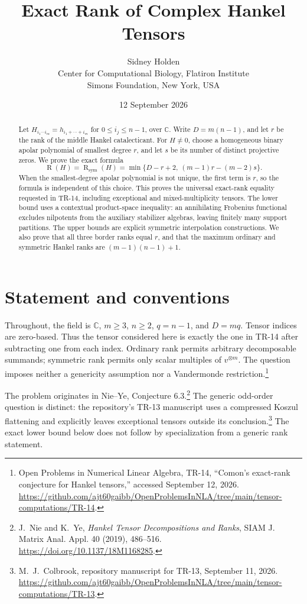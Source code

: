 \documentclass[11pt]{article}
\title{Exact Rank of Complex Hankel Tensors}
\author{Sidney Holden\\{\small Center for Computational Biology, Flatiron Institute}\\{\small Simons Foundation, New York, USA}}
\date{12 September 2026}
\theoremstyle{definition}
\theoremstyle{remark}
\newcommand{\C}{\mathbb C}
\newcommand{\Rk}{\operatorname{R}}
\newcommand{\SR}{\operatorname{R}_{\mathrm{sym}}}
\begin{document}
\maketitle

\begin{abstract}
Let $H_{i_1\cdots i_m}=h_{i_1+\cdots+i_m}$ for $0\le i_j\le n-1$, over $\C$.
Write $D=m(n-1)$, and let $r$ be the rank of the middle Hankel catalecticant.
For $H\ne0$, choose a homogeneous binary apolar polynomial of smallest degree $r$,
and let $s$ be its number of distinct projective zeros.
We prove the exact formula
\[
\Rk(H)=\SR(H)=\min\{D-r+2,\ (m-1)r-(m-2)s\}.
\]
When the smallest-degree apolar polynomial is not unique, the first term is $r$,
so the formula is independent of this choice. This proves the universal exact-rank
equality requested in TR-14, including exceptional and mixed-multiplicity tensors.
The lower bound uses a contextual product-space inequality: an annihilating
Frobenius functional excludes nilpotents from the auxiliary stabilizer algebras,
leaving finitely many support partitions. The upper bounds are explicit symmetric
interpolation constructions. We also prove that all three border ranks equal $r$,
and that the maximum ordinary and symmetric Hankel ranks are
$(m-1)(n-1)+1$.
\end{abstract}

\section{Statement and conventions}

Throughout, the field is $\C$, $m\ge3$, $n\ge2$, $q=n-1$, and $D=mq$.
Tensor indices are zero-based. Thus the tensor considered here is exactly the
one in TR-14 after subtracting one from each index. Ordinary rank permits
arbitrary decomposable summands; symmetric rank permits only scalar multiples
of $v^{\otimes m}$. The question imposes neither a genericity assumption nor a
Vandermonde restriction.\footnote{Open Problems in Numerical Linear Algebra,
TR-14, ``Comon's exact-rank conjecture for Hankel tensors,'' accessed September 12,
2026. \url{https://github.com/ajt60gaibb/OpenProblemsInNLA/tree/main/tensor-computations/TR-14}.}

The problem originates in Nie--Ye, Conjecture 6.3.\footnote{J.~Nie and K.~Ye,
\emph{Hankel Tensor Decompositions and Ranks}, SIAM J. Matrix Anal. Appl.
40 (2019), 486--516. \url{https://doi.org/10.1137/18M1168285}.}
The generic odd-order question is distinct: the repository's TR-13 manuscript
uses a compressed Koszul flattening and explicitly leaves exceptional tensors
outside its conclusion.\footnote{M.~J.~Colbrook, repository manuscript for TR-13,
September 11, 2026. \url{https://github.com/ajt60gaibb/OpenProblemsInNLA/tree/main/tensor-computations/TR-13}.}
The exact lower bound below does not follow by specialization from a generic
rank statement.
\end{document}
